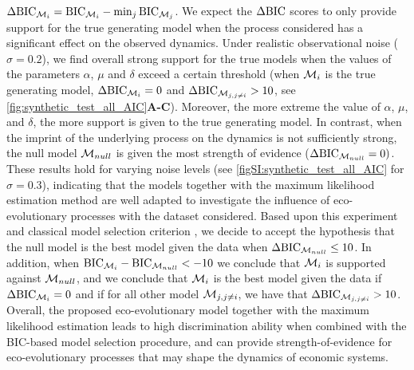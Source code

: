 %
$\Delta \text{BIC}_{\mathcal{M}_i} = \text{BIC}_{\mathcal{M}_i} - \min_{j} \text{BIC}_{\mathcal{M}_j}$. 
%
We expect the $\Delta \text{BIC}$ scores to only provide support for the true generating model when the process considered has a significant effect on the observed dynamics.
Under realistic observational noise ($\sigma = 0.2$), we find overall strong support for the true models when the values of the parameters $\alpha$, $\mu$ and $\delta$ exceed a certain threshold (when $\mathcal{M}_i$ is the true generating model, $\Delta\text{BIC}_{\mathcal{M}_{i}} = 0$ and $\Delta\text{BIC}_{\mathcal{M}_{j,j\neq i}} > 10$, see \cref{fig:synthetic_test_all_AIC}\textbf{A-C}). 
% 
% 
% 
Moreover, the more extreme the value of $\alpha$, $\mu$, and $\delta$, the more support is given to the true generating model.
% 
In contrast, when the imprint of the underlying process on the dynamics is not sufficiently strong, the null model $\mathcal{M}_{null}$ is given the most strength of evidence ($\Delta\text{BIC}_{\mathcal{M}_{null}} = 0)$.
% 
% 
These results hold for varying noise levels (see \cref{figSI:synthetic_test_all_AIC} for $\sigma = 0.3$), indicating that the models together with the maximum likelihood estimation method are well adapted to investigate the influence of eco-evolutionary processes with the dataset considered.
%
Based upon this experiment and classical model selection criterion \cite{Burnham2002}, we decide to accept the hypothesis that the null model is the best model given the data when $\Delta \text{BIC}_{\mathcal{M}_{null}} \leq 10$. In addition, when $\text{BIC}_{\mathcal{M}_i} - \text{BIC}_{\mathcal{M}_{null}} < -10$ we conclude that $\mathcal{M}_i$ is supported against $\mathcal{M}_{null}$, and we conclude that $\mathcal{M}_i$ is the best model given the data if $\Delta \text{BIC}_{\mathcal{M}_i} = 0 $ and if for all other model $\mathcal{M}_{j,j \neq i}$, we have that $\Delta \text{BIC}_{\mathcal{M}_{j,j \neq i}} > 10$.
Overall, the proposed eco-evolutionary model together with the maximum likelihood estimation leads to high discrimination ability when combined with the BIC-based model selection procedure, and can provide strength-of-evidence for eco-evolutionary processes that may shape the dynamics of economic systems.

